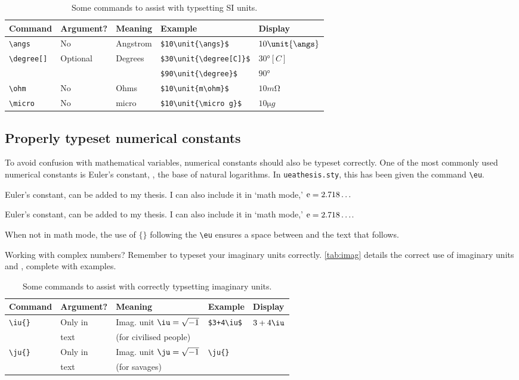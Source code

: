 \begin{table}
\renewcommand{\arraystretch}{1.5}
\centering
\begin{tabular}{lllll}
Command & Argument? & Meaning & Example & Display\\ \hline
\verb|\angs| & No & Angstrom & \verb|$10\unit{\angs}$| & $10\unit{\angs}$\\
\verb|\degree[]| & Optional & Degrees & \verb|$30\unit{\degree[C]}$| & $30\unit{\degree[C]}$ \\
& & & \verb|$90\unit{\degree}$| & $90\unit{\degree}\quad$\\
\verb|\ohm| & No & Ohms & \verb|$10\unit{m\ohm}$| & $10\unit{m\ohm}$\\
\verb|\micro| & No & micro & \verb|$10\unit{\micro g}$| & $10\unit{\micro g}$\\
\end{tabular}
\caption{Some commands to assist with typsetting SI units.}\label{tab:si}
\end{table}

\subsection{Properly typeset numerical constants}
To avoid confusion with mathematical variables, numerical constants should also be typeset correctly. One of the most commonly used numerical constants is Euler's constant, \eu, the base of natural logarithms. In \verb|ueathesis.sty|, this has been given the command \verb|\eu|.
\begin{spverbatim}
Euler's constant, \eu{} can be added to my thesis. I can also include it in `math mode,' $\eu=2.718\ldots$
\end{spverbatim}
Euler's constant, \eu{} can be added to my thesis. I can also include it in `math mode,' $\mathrm{e}=2.718\ldots$.
\begin{remark}
When not in math mode, the use of $\{\}$ following the \verb|\eu| ensures a space between \eu{} and the text that follows.
\end{remark}
Working with complex numbers? Remember to typeset your imaginary units correctly. \autoref{tab:imag} details the correct use of imaginary units \iu{} and \ju{}, complete with examples.
\begin{table}[ht!]
\renewcommand{\arraystretch}{1.5}
\centering
\begin{tabular}{lllll}
Command & Argument? & Meaning & Example & Display\\ \hline
\verb|\iu{}| & Only in & Imag. unit $\iu=\sqrt{-1}$ & \verb|$3+4\iu$| & $3+4\iu$\\
 & text &  (for civilised people) & & \\
\verb|\ju{}| & Only in & Imag. unit $\ju=\sqrt{-1}$ & \verb|\ju{}| & \ju{}  \\
 & text &  (for savages) &  & \\
\end{tabular}
\caption{Some commands to assist with correctly typsetting imaginary units.}\label{tab:imag}
\end{table}

